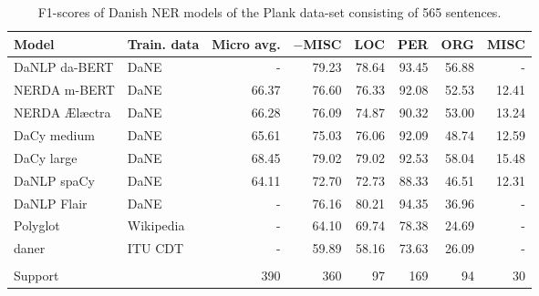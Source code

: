 \documentclass[main.tex]{subfiles}
\begin{document}
\begin{table}
        \begin{center}
                \begin{tabular}{l l r r r r r r}
                        Model & Train. data & Micro avg. & $-$MISC & LOC & PER & ORG & MISC \\
                        \hline
                        DaNLP da-BERT & DaNE & - & 79.23 & 78.64 & 93.45 & 56.88 & - \\
                        NERDA m-BERT & DaNE & 66.37 & 76.60 & 76.33 & 92.08 & 52.53 & 12.41 \\
                        NERDA Ælæctra & DaNE & 66.28 & 76.09 & 74.87 & 90.32 & 53.00 & 13.24 \\
                        DaCy medium & DaNE & 65.61 & 75.03 & 76.06 & 92.09 & 48.74 & 12.59 \\
                        DaCy large & DaNE & 68.45 & 79.02 & 79.02 & 92.53 & 58.04 & 15.48 \\
                        DaNLP spaCy & DaNE & 64.11 & 72.70 & 72.73 & 88.33 & 46.51 & 12.31 \\
                        DaNLP Flair & DaNE & - & 76.16 & 80.21 & 94.35 & 36.96 & - \\
                        Polyglot & Wikipedia & - & 64.10 & 69.74 & 78.38 & 24.69 & - \\
                        daner & ITU CDT & - & 59.89 & 58.16 & 73.63 & 26.09 & - \\
                         &  &  &  &  &  &  &  \\
                        Support &  & 390 & 360 & 97 & 169 & 94 & 30 \\
                \end{tabular}
        \end{center}
        \caption{F1\pro-scores of Danish NER models of the Plank data-set consisting of 565 sentences.}
        \label{tab:Plank}
\end{table}
\end{document}
